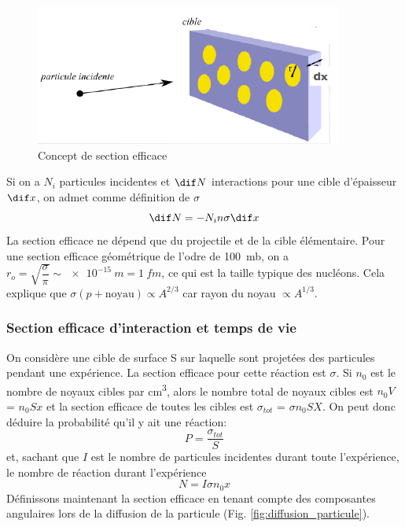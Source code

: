 \begin{figure}[ht]
    \centering
    \includegraphics[scale=0.75]{Images1/section_efficace.PNG}
    \caption{Concept de section efficace}
    \label{fig:section_efficace}
\end{figure}
Si on a $N_i$ particules incidentes et $\dif N$ interactions pour une cible d'épaisseur $\dif x$, on admet comme définition de $\sigma$
\[
    \dif N=-N_in\sigma \dif x
\]
La section efficace ne dépend que du projectile et de la cible élémentaire. Pour une section efficace géométrique de l'odre de \SI{100}{mb}, on a $r_o=\sqrt{\dfrac{\sigma}{\pi}}\sim \SI{e-15}{m} = \SI{1}{fm}$, ce qui est la taille typique des nucléons. Cela explique que $\sigma(p+\text{noyau})\propto A^{2/3}$ car rayon du noyau $\propto A^{1/3}$.

\subsubsection{Section efficace d'interaction et temps de vie}
On considère une cible de surface S sur laquelle sont projetées des particules pendant une expérience. La section efficace pour cette réaction est $\sigma$. Si $n_0$ est le nombre de noyaux cibles par \si{cm^3}, alors le nombre total de noyaux cibles est $n_0 V$ = $n_0 S x$ et la section efficace de toutes les cibles est $\sigma_{tot}$ = $\sigma n_0 S X$. On peut donc déduire la probabilité qu'il y ait une réaction:
\[
    P=\dfrac{\sigma_{tot}}{S}
\]
et, sachant que $I$ est le nombre de particules incidentes durant toute l'expérience, le nombre de réaction durant l'expérience
\[
    N=I \sigma n_0 x
\]
Définissons maintenant la section efficace en tenant compte des composantes angulaires lors de la diffusion de la particule (Fig. \ref{fig:diffusion_particule}).

